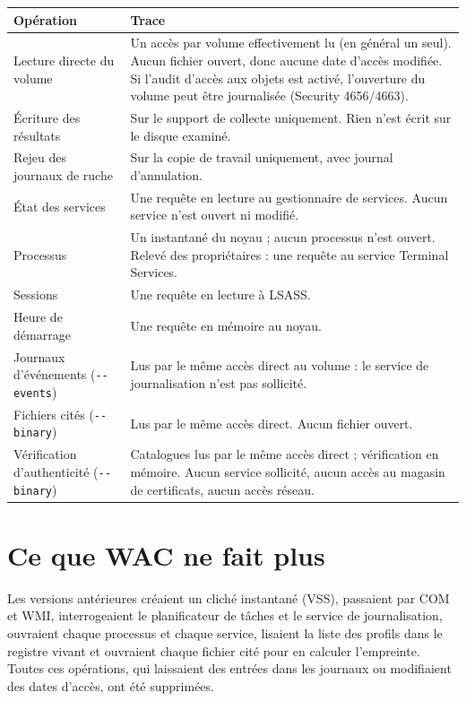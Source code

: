 \documentclass[11pt,a4paper,oneside]{report}
\newcommand{\opt}[1]{\texttt{-{}-#1}}
\begin{document}
\begin{longtable}{@{}L{4.3cm}L{10.1cm}@{}}
\toprule
\bfseries Opération & \bfseries Trace \\
\midrule
\endhead
Lecture directe du volume & Un accès par volume effectivement lu (en général un
  seul). Aucun fichier ouvert, donc aucune date d'accès modifiée. Si l'audit
  d'accès aux objets est activé, l'ouverture du volume peut être journalisée
  (Security 4656/4663). \\
Écriture des résultats & Sur le support de collecte uniquement. Rien n'est écrit
  sur le disque examiné. \\
Rejeu des journaux de ruche & Sur la copie de travail uniquement, avec journal
  d'annulation. \\
État des services & Une requête en lecture au gestionnaire de services. Aucun
  service n'est ouvert ni modifié. \\
Processus & Un instantané du noyau ; aucun processus n'est ouvert. Relevé des
  propriétaires : une requête au service Terminal Services. \\
Sessions & Une requête en lecture à LSASS. \\
Heure de démarrage & Une requête en mémoire au noyau. \\
Journaux d'événements (\opt{events}) & Lus par le même accès direct au volume :
  le service de journalisation n'est pas sollicité. \\
Fichiers cités (\opt{binary}) & Lus par le même accès direct. Aucun fichier
  ouvert. \\
Vérification d'authenticité (\opt{binary}) & Catalogues lus par le même accès
  direct ; vérification en mémoire. Aucun service sollicité, aucun accès au
  magasin de certificats, aucun accès réseau. \\
\bottomrule
\end{longtable}

\section{Ce que WAC ne fait plus}

Les versions antérieures créaient un cliché instantané (VSS), passaient par COM et
WMI, interrogeaient le planificateur de tâches et le service de journalisation,
ouvraient chaque processus et chaque service, lisaient la liste des profils dans
le registre vivant et ouvraient chaque fichier cité pour en calculer
l'empreinte. Toutes ces opérations, qui laissaient des entrées dans les journaux
ou modifiaient des dates d'accès, ont été supprimées.
\end{document}
